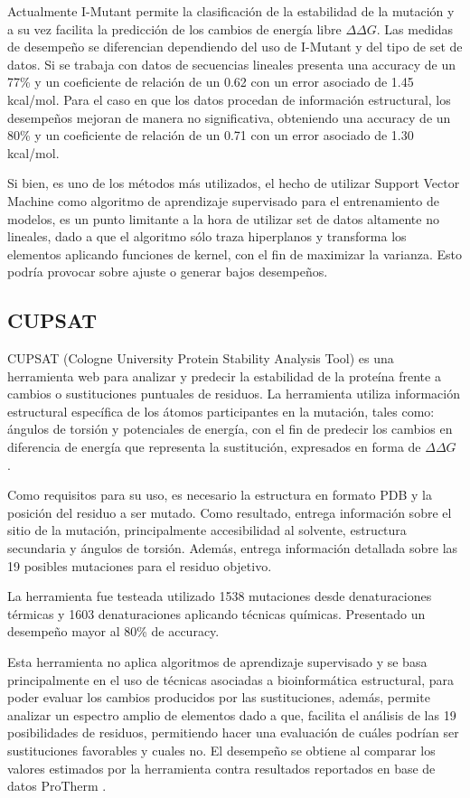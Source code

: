 Actualmente  I-Mutant permite la clasificación de la estabilidad de la mutación y a su vez facilita la predicción de los cambios de energía libre $\Delta \Delta G$. Las medidas de desempeño se diferencian dependiendo del uso de I-Mutant y del tipo de set de datos. Si se trabaja con datos de secuencias lineales presenta una accuracy de un 77\% y un coeficiente de relación de un 0.62 con un error asociado de 1.45 kcal/mol. Para el caso en que los datos procedan de información estructural, los desempeños mejoran de manera no significativa, obteniendo una accuracy de un 80\% y un coeficiente de relación de un 0.71 con un error asociado de 1.30 kcal/mol.

Si bien, es uno de los métodos más utilizados, el hecho de utilizar Support Vector Machine como algoritmo de aprendizaje supervisado para el entrenamiento de modelos, es un punto limitante a la hora de utilizar set de datos altamente no lineales, dado a que el algoritmo sólo traza hiperplanos y transforma los elementos aplicando funciones de kernel, con el fin de maximizar la varianza. Esto podría provocar sobre ajuste o generar bajos desempeños.

\subsection{CUPSAT}

CUPSAT (Cologne University Protein Stability Analysis Tool) es una herramienta web para analizar y predecir la estabilidad de la proteína frente a cambios o sustituciones puntuales de residuos. La herramienta utiliza información estructural específica de los átomos participantes en la mutación, tales como: ángulos de torsión y potenciales de energía, con el fin de predecir los cambios en diferencia de energía que representa la sustitución, expresados en forma de $\Delta \Delta G$ \cite{Parthiban2006}. 

Como requisitos para su uso, es necesario la estructura en formato PDB y la posición del residuo a ser mutado. Como resultado, entrega información sobre el sitio de la mutación, principalmente accesibilidad al solvente, estructura secundaria y ángulos de torsión. Además, entrega información detallada sobre las 19 posibles mutaciones para el residuo objetivo.

La herramienta fue testeada utilizado 1538 mutaciones desde denaturaciones térmicas y 1603 denaturaciones aplicando técnicas químicas. Presentado un desempeño mayor al 80\% de accuracy.

Esta herramienta no aplica algoritmos de aprendizaje supervisado y se basa principalmente en el uso de técnicas asociadas a bioinformática estructural, para poder evaluar los cambios producidos por las sustituciones, además, permite analizar un espectro amplio de elementos dado a que, facilita el análisis de las 19 posibilidades de residuos, permitiendo hacer una evaluación de cuáles podrían ser sustituciones favorables y cuales no. El desempeño se obtiene al comparar los valores estimados por la herramienta contra resultados reportados en base de datos ProTherm \cite{Bava2004}.



